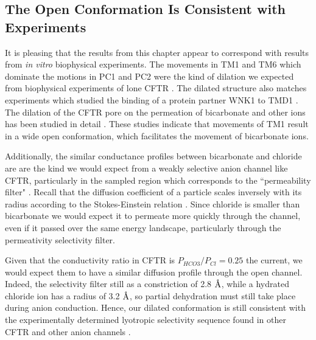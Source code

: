 

\subsection{The Open Conformation Is Consistent with Experiments}
It is pleasing that the results from this chapter appear to correspond with results from \textit{in vitro} biophysical experiments. The movements in TM1 and TM6 which dominate the motions in PC1 and PC2 were the kind of dilation we expected from biophysical experiments of lone CFTR \cite{negoda2018, negoda2019,linsdell2016}. The dilated structure also matches experiments which studied the binding of a protein partner WNK1 to TMD1 \cite{kim2019}. The dilation of the CFTR pore on the permeation of bicarbonate and other ions has been studied in detail \cite{jun2016, kim2019}. These studies indicate that movements of TM1 result in a wide open conformation, which facilitates the movement of bicarbonate ions.  

Additionally, the similar conductance profiles between bicarbonate and chloride are are the kind we would expect from a weakly selective anion channel like CFTR, particularly in the sampled region which corresponds to the ``permeability filter" \cite{linsdell2016}. Recall that the diffusion coefficient of a particle scales inversely with its radius according to the Stokes-Einstein relation \cite{miller1924}. Since chloride is smaller than bicarbonate we would expect it to permeate more quickly through the channel, even if it passed over the same energy landscape, particularly through the permeativity selectivity filter. 

Given that the conductivity ratio in CFTR is $P_{HCO3}/P_{Cl}=0.25$ the current, we would expect them to have a similar diffusion profile through the open channel. Indeed, the selectivity filter still as a constriction of 2.8 $\textup{\AA}$, while a hydrated chloride ion has a radius of 3.2 $\textup{\AA}$, so partial dehydration must still take place during anion conduction. Hence, our dilated conformation is still consistent with the experimentally determined lyotropic selectivity sequence found in other CFTR and other anion channels \cite{linsdell2016}. 

